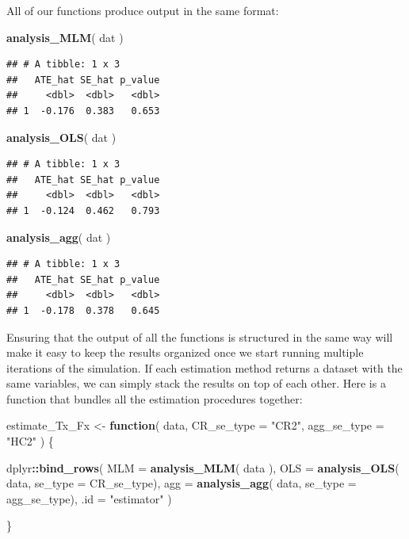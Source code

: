 \documentclass[
]{book}
\newenvironment{Shaded}{\begin{snugshade}}{\end{snugshade}}
\newcommand{\AttributeTok}[1]{\textcolor[rgb]{0.13,0.29,0.53}{#1}}
\newcommand{\ControlFlowTok}[1]{\textcolor[rgb]{0.13,0.29,0.53}{\textbf{#1}}}
\newcommand{\FunctionTok}[1]{\textcolor[rgb]{0.13,0.29,0.53}{\textbf{#1}}}
\newcommand{\NormalTok}[1]{#1}
\newcommand{\OtherTok}[1]{\textcolor[rgb]{0.56,0.35,0.01}{#1}}
\newcommand{\SpecialCharTok}[1]{\textcolor[rgb]{0.81,0.36,0.00}{\textbf{#1}}}
\newcommand{\StringTok}[1]{\textcolor[rgb]{0.31,0.60,0.02}{#1}}
\begin{document}
All of our functions produce output in the same format:

\begin{Shaded}
\begin{Highlighting}[]
\FunctionTok{analysis\_MLM}\NormalTok{( dat )}
\end{Highlighting}
\end{Shaded}

\begin{verbatim}
## # A tibble: 1 x 3
##   ATE_hat SE_hat p_value
##     <dbl>  <dbl>   <dbl>
## 1  -0.176  0.383   0.653
\end{verbatim}

\begin{Shaded}
\begin{Highlighting}[]
\FunctionTok{analysis\_OLS}\NormalTok{( dat )}
\end{Highlighting}
\end{Shaded}

\begin{verbatim}
## # A tibble: 1 x 3
##   ATE_hat SE_hat p_value
##     <dbl>  <dbl>   <dbl>
## 1  -0.124  0.462   0.793
\end{verbatim}

\begin{Shaded}
\begin{Highlighting}[]
\FunctionTok{analysis\_agg}\NormalTok{( dat )}
\end{Highlighting}
\end{Shaded}

\begin{verbatim}
## # A tibble: 1 x 3
##   ATE_hat SE_hat p_value
##     <dbl>  <dbl>   <dbl>
## 1  -0.178  0.378   0.645
\end{verbatim}

Ensuring that the output of all the functions is structured in the same way will make it easy to keep the results organized once we start running multiple iterations of the simulation.
If each estimation method returns a dataset with the same variables, we can simply stack the results on top of each other.
Here is a function that bundles all the estimation procedures together:

\begin{Shaded}
\begin{Highlighting}[]
\NormalTok{estimate\_Tx\_Fx }\OtherTok{\textless{}{-}} \ControlFlowTok{function}\NormalTok{(}
\NormalTok{    data, }
    \AttributeTok{CR\_se\_type =} \StringTok{"CR2"}\NormalTok{, }\AttributeTok{agg\_se\_type =} \StringTok{"HC2"}
\NormalTok{) \{}
  
\NormalTok{  dplyr}\SpecialCharTok{::}\FunctionTok{bind\_rows}\NormalTok{(}
    \AttributeTok{MLM =} \FunctionTok{analysis\_MLM}\NormalTok{( data ),}
    \AttributeTok{OLS =} \FunctionTok{analysis\_OLS}\NormalTok{( data, }\AttributeTok{se\_type =}\NormalTok{ CR\_se\_type),}
    \AttributeTok{agg =} \FunctionTok{analysis\_agg}\NormalTok{( data, }\AttributeTok{se\_type =}\NormalTok{ agg\_se\_type),}
    \AttributeTok{.id =} \StringTok{"estimator"}
\NormalTok{  )}
  
\NormalTok{\}}
\end{Highlighting}
\end{Shaded}
\end{document}
